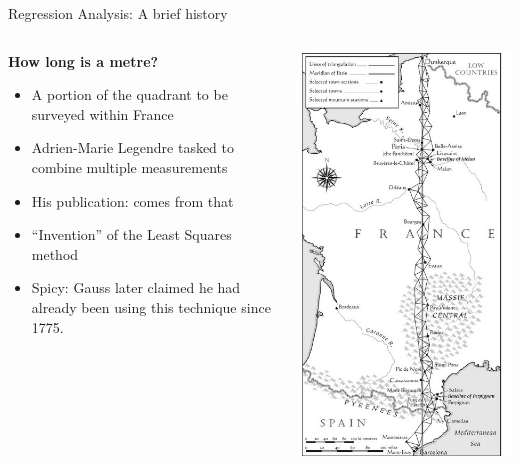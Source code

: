 \documentclass[t]{beamer} 	%
\begin{document}
\begin{frame}{Regression Analysis: A brief history}
	\begin{columns}
		\begin{column}[T]{0.5\textwidth}
			\textbf{How long is a metre?}
			\begin{itemize}
				\item A portion of the quadrant to be surveyed within France
				\item Adrien-Marie Legendre tasked to combine multiple measurements
				\item His publication: \citet{legendre1805} comes from that
				\item ``Invention'' of the Least Squares method
				\item Spicy: Gauss later claimed he had already been using this technique since 1775.
			\end{itemize}
		\end{column}
		\begin{column}[T]{0.5\textwidth}
			\centering
			\includegraphics[height = 0.85\textheight]{images/paris_map}
		\end{column}
	\end{columns}

\end{frame}
\end{document}
